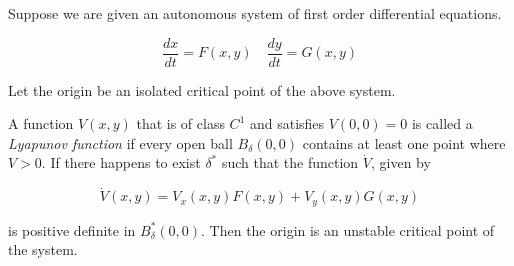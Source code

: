 \documentclass[12pt]{article}
\begin{document}
Suppose we are given an autonomous system of first order
differential equations.

\[
\frac{dx}{dt}=F(x,y)\quad\frac{dy}{dt}=G(x,y)
\]


Let the origin be an isolated critical point of the above system.

A function $V(x,y)$ that is of class $C^{1}$ and satisfies
$V(0,0)=0$ is called a \emph{Lyapunov function} if every open ball
$B_{\delta}(0,0)$ contains at least one point where $V>0.$ If
there happens to exist $\delta^{*}$ such that the function
$\dot{V}$, given by

\[
\dot{V}(x,y)=V_{x}(x,y)F(x,y)+V_{y}(x,y)G(x,y)
\]

is positive definite in $B_{\delta}^{*}(0,0)$.  Then the origin is
an unstable critical point of the system.
\end{document}

